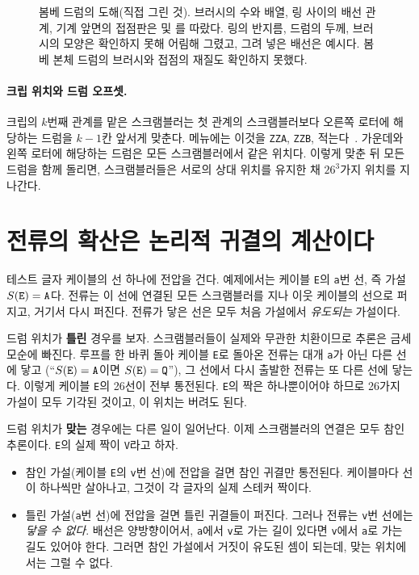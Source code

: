 \begin{figure}[ht]
\centering

\caption{봄베 드럼의 도해(직접 그린 것). 브러시의 수와 배열, 링 사이의 배선 관계, 기계 앞면의 접점판은
\cite{ellsbury1998bombe,jackson-bh10} 및 \cite[68]{us6812report1944}를 따랐다. 링의 반지름, 드럼의 두께,
브러시의 모양은 확인하지 못해 어림해 그렸고, 그려 넣은 배선은 예시다. 봄베 본체 드럼의 브러시와 접점의 재질도
확인하지 못했다.}
\label{fig:bombe-drum}
\end{figure}

\paragraph{크립 위치와 드럼 오프셋.} 크립의 $k$번째 관계를 맡은 스크램블러는 첫 관계의 스크램블러보다
오른쪽 로터에 해당하는 드럼을 $k-1$칸 앞서게 맞춘다. 메뉴에는 이것을 \texttt{ZZA}, \texttt{ZZB}, 
적는다~\cite[7]{us6812report1944}. 가운데와 왼쪽 로터에 해당하는 드럼은 모든 스크램블러에서 같은 위치다.
이렇게 맞춘 뒤 모든 드럼을 함께 돌리면, 스크램블러들은 서로의 상대 위치를 유지한 채 $26^3$가지 위치를
지나간다.

\section{전류의 확산은 논리적 귀결의 계산이다}\label{sec:spread}

테스트 글자 케이블의 선 하나에 전압을 건다. 예제에서는 케이블 \texttt{E}의 \texttt{a}번 선, 즉 가설
$S(\mathtt{E}) = \mathtt{A}$다. 전류는 이 선에 연결된 모든 스크램블러를 지나 이웃 케이블의 선으로
퍼지고, 거기서 다시 퍼진다. 전류가 닿은 선은 모두 처음 가설에서 \emph{유도되는} 가설이다.

드럼 위치가 \textbf{틀린} 경우를 보자. 스크램블러들이 실제와 무관한 치환이므로 추론은 금세 모순에
빠진다. 루프를 한 바퀴 돌아 케이블 \texttt{E}로 돌아온 전류는 대개 \texttt{a}가 아닌 다른 선에 닿고
(``$S(\mathtt{E})=\mathtt{A}$이면 $S(\mathtt{E})=\mathtt{Q}$''), 그 선에서 다시 출발한 전류는 또 다른
선에 닿는다. 이렇게 케이블 \texttt{E}의 26선이 전부 통전된다. \texttt{E}의 짝은 하나뿐이어야 하므로
26가지 가설이 모두 기각된 것이고, 이 위치는 버려도 된다.

드럼 위치가 \textbf{맞는} 경우에는 다른 일이 일어난다. 이제 스크램블러의 연결은 모두 참인 추론이다.
\texttt{E}의 실제 짝이 \texttt{V}라고 하자.

\begin{itemize}
\item 참인 가설(케이블 \texttt{E}의 \texttt{v}번 선)에 전압을 걸면 참인 귀결만 통전된다. 케이블마다 선이
하나씩만 살아나고, 그것이 각 글자의 실제 스테커 짝이다.
\item 틀린 가설(\texttt{a}번 선)에 전압을 걸면 틀린 귀결들이 퍼진다. 그러나 전류는 \texttt{v}번 선에는
\emph{닿을 수 없다}. 배선은 양방향이어서, \texttt{a}에서 \texttt{v}로 가는 길이 있다면 \texttt{v}에서
\texttt{a}로 가는 길도 있어야 한다. 그러면 참인 가설에서 거짓이 유도된 셈이 되는데, 맞는 위치에서는
그럴 수 없다.
\end{itemize}

